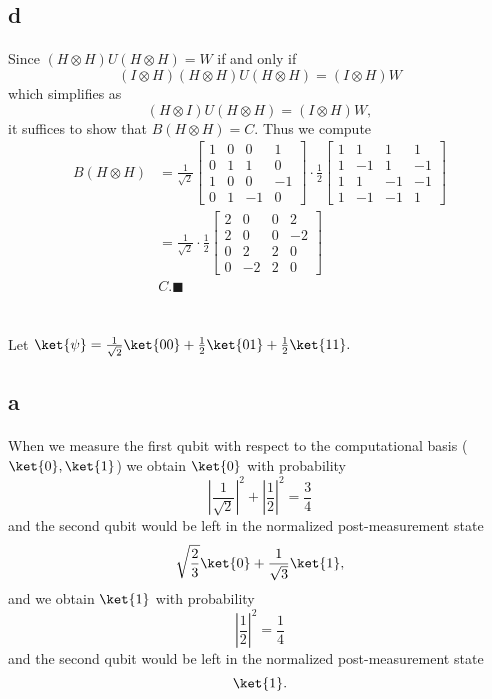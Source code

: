 \documentclass[letterpaper,12pt,oneside,onecolumn]{article}
\begin{document}
\subsection{d}
\paragraph{}
Since $(H\otimes H)U(H\otimes H) = W$ if and only if 
$$(I \otimes H)(H \otimes H) U(H \otimes H) = (I\otimes H) W$$
which simplifies as
$$(H\otimes I) U(H\otimes H) = (I \otimes H) W,$$
it suffices to show that $B (H\otimes H) = C$. Thus we compute
\begin{align*}B(H\otimes H) &= \frac{1}{\sqrt{2}} \begin{bmatrix} 1 & 0 & 0 & 1 \\ 0 & 1 & 1 & 0 \\ 1 & 0 & 0 & -1\\ 0 & 1 & -1 & 0\end{bmatrix}\cdot \frac{1}{2}\begin{bmatrix} 1 & 1 & 1 & 1 \\ 1 & - 1 & 1 & -1 \\ 1 & 1& -1 & -1 \\ 1 & -1 & -1 &1\end{bmatrix} \\
&=\frac{1}{\sqrt{2}}\cdot \frac{1}{2}\begin{bmatrix}2 &0 & 0 & 2 \\ 2 & 0 & 0 & -2 \\ 0 & 2 & 2 & 0 \\ 0 & -2 & 2 & 0 \end{bmatrix} \\
& C. \blacksquare\end{align*}
\section{}
\paragraph{}
Let $\ket{\psi} = \frac{1}{\sqrt{2}}\ket{00} + \frac{1}{2}\ket{01} + \frac{1}{2}\ket{11}.$
\subsection{a}
\paragraph{}
When we measure the first qubit with respect to the computational basis ($\ket{0}, \ket{1}$) we obtain $\ket{0}$ with probability
$$|\frac{1}{\sqrt{2}}|^2 + |\frac{1}{2}|^2 = \frac{3}{4}$$
and the second qubit would be left in the normalized post-measurement state
$$\sqrt{\frac{2}{3}} \ket{0} + \frac{1}{\sqrt{3}} \ket{1},$$
and we obtain $\ket{1}$ with probability
$$|\frac{1}{2}|^2 = \frac{1}{4}$$
and the second qubit would be left in the normalized post-measurement state
$$\ket{1}.$$
\end{document}
